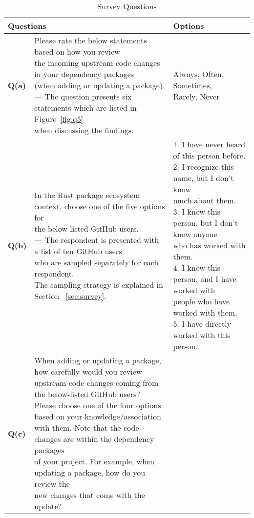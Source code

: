 \documentclass[10pt,journal,compsoc]{IEEEtran}
\begin{document}
  \begin{table*}[]
    \centering
    \caption{Survey Questions}
    \begin{tabular}{|ll|l|}
    \hline
    \multicolumn{2}{|l|}{\textbf{Questions}}& \textbf{Options}\\
    \hline
    \textbf{Q(a)} & \makecell[l]{Please rate the below statements based on how you review \\the incoming upstream code changes in your dependency packages \\(when adding or updating a package).\\
    --- The question presents six statements which are listed in Figure~\ref{fig:q5} \\when discussing the findings.} & \makecell[l]{Always, Often, Sometimes, \\Rarely, Never}\\
    \hline
        \textbf{Q(b)} & \makecell[l]{ In the Rust package ecosystem context, choose one of the five options for \\the below-listed GitHub users.\\
        --- The respondent is presented with a list of ten GitHub users\\who are sampled separately for each respondent. \\The sampling strategy is explained in Section ~\ref{sec:survey}.
        } & \makecell[l]{
        1. I have never heard of this person before.\\2. I recognize this name, but I don't know\\ much about them.\\3. I know this person, but I don't know anyone\\ who has worked with them.\\4. I know this person, and I have worked with \\people who have worked with them.\\5. I have directly worked with this person.
        }\\
        \hline
         \textbf{Q(c)} & \makecell[l]{ When adding or updating a package, how carefully would you review\\ upstream code changes coming from the below-listed GitHub users?\\
Please choose one of the four options based on your knowledge/association\\ with them. Note that the code changes are within the dependency packages \\of your project. For example, when updating a package, how do you review the \\new changes that come with the update?\\
}
\end{tabular}
\end{table*}
\end{document}
